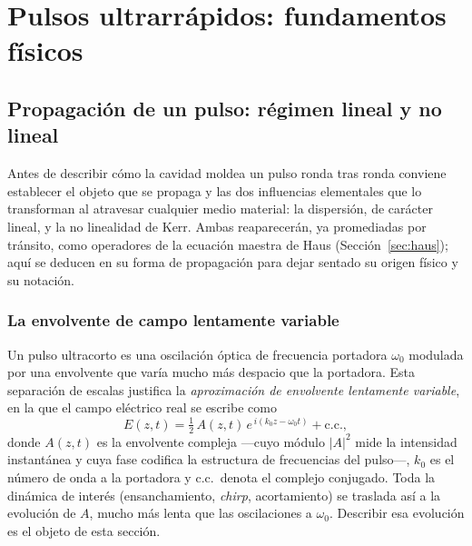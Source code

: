 \chapter{Pulsos ultrarrápidos: fundamentos físicos}
\label{ch:Theoretical background}
\chapterminitoc


\section{Propagación de un pulso: régimen lineal y no lineal}
\label{sec:propagacion}

Antes de describir cómo la cavidad moldea un pulso ronda tras ronda conviene
establecer el objeto que se propaga y las dos influencias elementales que lo
transforman al atravesar cualquier medio material: la dispersión, de carácter
lineal, y la no linealidad de Kerr. Ambas reaparecerán, ya promediadas por
tránsito, como operadores de la ecuación maestra de Haus
(Sección~\ref{sec:haus}); aquí se deducen en su forma de propagación para dejar
sentado su origen físico y su notación.

\subsection{La envolvente de campo lentamente variable}

Un pulso ultracorto es una oscilación óptica de frecuencia portadora $\omega_0$
modulada por una envolvente que varía mucho más despacio que la portadora. Esta
separación de escalas justifica la \emph{aproximación de envolvente lentamente
variable}, en la que el campo eléctrico real se escribe como
%
\begin{equation}
    E(z,t) = \tfrac{1}{2}\,A(z,t)\,
    e^{\,i(k_0 z - \omega_0 t)} + \text{c.c.},
    \label{eq:envolvente}
\end{equation}
%
donde $A(z,t)$ es la envolvente compleja —cuyo módulo $|A|^2$ mide la intensidad
instantánea y cuya fase codifica la estructura de frecuencias del pulso—, $k_0$
es el número de onda a la portadora y c.c.\ denota el complejo conjugado. Toda la
dinámica de interés (ensanchamiento, \emph{chirp}, acortamiento) se traslada así a
la evolución de $A$, mucho más lenta que las oscilaciones a $\omega_0$. Describir
esa evolución es el objeto de esta sección.

